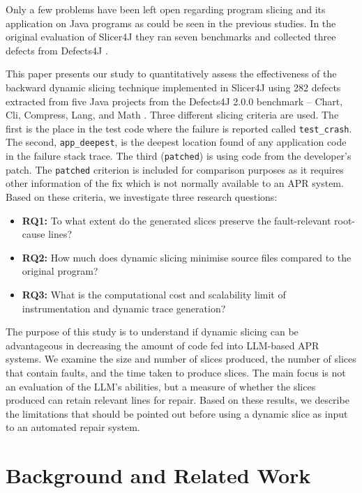 \documentclass[sigconf,nonacm]{acmart}
\begin{document}
Only a few problems have been left open regarding program slicing and its application on Java programs as could be seen in the previous studies. In the original evaluation of Slicer4J they ran seven benchmarks and collected three defects from Defects4J \cite{Ahmed2021Slicer4J}.

This paper presents our study to quantitatively assess the effectiveness of the backward dynamic slicing technique implemented in Slicer4J using 282 defects extracted from five Java projects from the Defects4J 2.0.0 benchmark -- Chart, Cli, Compress, Lang, and Math \cite{Just2014Defects4J}. Three different slicing criteria are used. The first is the place in the test code where the failure is reported called \texttt{test\_crash}. The second, \texttt{app\_deepest}, is the deepest location found of any application code in the failure stack trace. The third (\texttt{patched}) is using code from the developer's patch. The \texttt{patched} criterion is included for comparison purposes as it requires other information of the fix which is not normally available to an APR system. Based on these criteria, we investigate three research questions:

\begin{itemize}
    \item \textbf{RQ1:} To what extent do the generated slices preserve the fault-relevant root-cause lines?
    \item \textbf{RQ2:} How much does dynamic slicing minimise source files compared to the original program?
    \item \textbf{RQ3:} What is the computational cost and scalability limit of instrumentation and dynamic trace generation?
\end{itemize}

The purpose of this study is to understand if dynamic slicing can be advantageous in decreasing the amount of code fed into LLM-based APR systems. We examine the size and number of slices produced, the number of slices that contain faults, and the time taken to produce slices. The main focus is not an evaluation of the LLM's abilities, but a measure of whether the slices produced can retain relevant lines for repair. Based on these results, we describe the limitations that should be pointed out before using a dynamic slice as input to an automated repair system.

\section{Background and Related Work}
\end{document}
